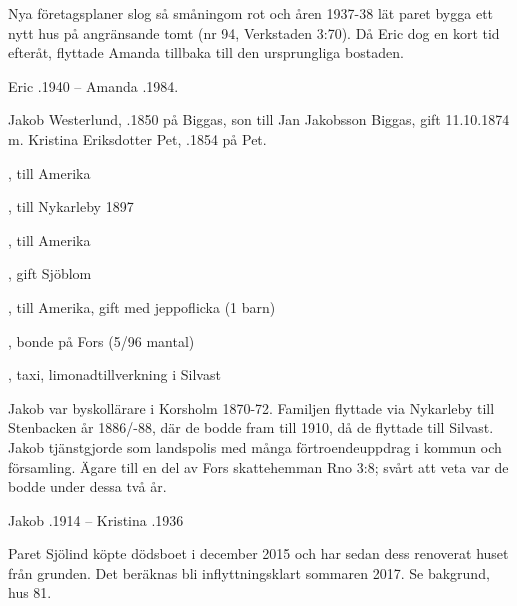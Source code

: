 Nya företagsplaner slog så småningom rot och åren 1937-38 lät paret bygga ett nytt hus på angränsande tomt (nr 94, Verkstaden 3:70). Då Eric dog en kort tid efteråt, flyttade Amanda tillbaka till den ursprungliga bostaden.

Eric .1940  --  Amanda .1984.



Jakob Westerlund, .1850 på Biggas, son till Jan Jakobsson Biggas, gift 11.10.1874 m. Kristina Eriksdotter Pet, .1854 på Pet.
\begin{jhchildren}
  \item {}, till Amerika
  \item {}, till Nykarleby 1897
  \item {}, till Amerika
  \item {}, gift Sjöblom
  \item {}, till Amerika, gift med jeppoflicka (1 barn)
  \item {}, bonde på Fors (5/96 mantal)
  \item {}
  \item {}
  \item {}
  \item {}, taxi, limonadtillverkning i Silvast
\end{jhchildren}

Jakob var byskollärare i Korsholm 1870-72. Familjen flyttade via Nykarleby till Stenbacken år 1886/-88, där de bodde fram till 1910, då de flyttade till Silvast. Jakob tjänstgjorde som landspolis med många förtroendeuppdrag i kommun och församling. Ägare till en del av Fors skattehemman Rno 3:8; svårt att veta var de bodde under dessa två år.

Jakob .1914  -- 	Kristina .1936




Paret Sjölind köpte dödsboet i december 2015 och har sedan dess renoverat huset från grunden. Det beräknas bli inflyttningsklart sommaren	2017. Se bakgrund, hus 81.



